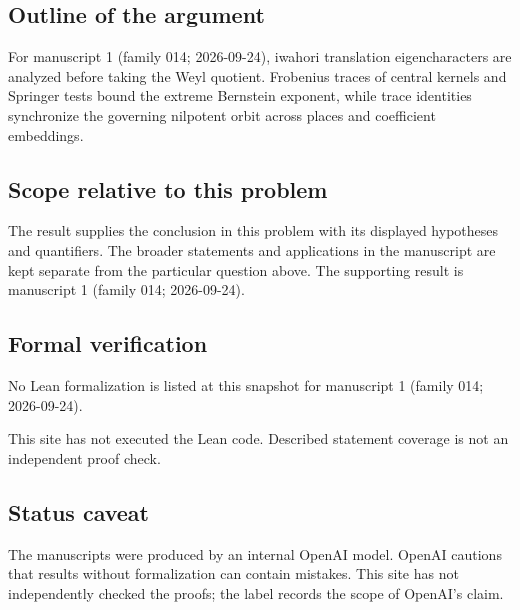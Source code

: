 \documentclass[11pt]{article}
\begin{document}
\subsection{Outline of the argument}
For manuscript 1 (family 014; 2026-09-24), iwahori translation eigencharacters are analyzed before taking the Weyl quotient. Frobenius traces of central kernels and Springer tests bound the extreme Bernstein exponent, while trace identities synchronize the governing nilpotent orbit across places and coefficient embeddings.

\subsection{Scope relative to this problem}
The result supplies the conclusion in this problem with its displayed hypotheses and quantifiers. The broader statements and applications in the manuscript are kept separate from the particular question above. The supporting result is manuscript 1 (family 014; 2026-09-24).

\subsection{Formal verification}
No Lean formalization is listed at this snapshot for manuscript 1 (family 014; 2026-09-24).

This site has not executed the Lean code. Described statement coverage is not an independent proof check.

\subsection{Status caveat}
The manuscripts were produced by an internal OpenAI model. OpenAI cautions that results without formalization can contain mistakes. This site has not independently checked the proofs; the label records the scope of OpenAI's claim.
\end{document}
